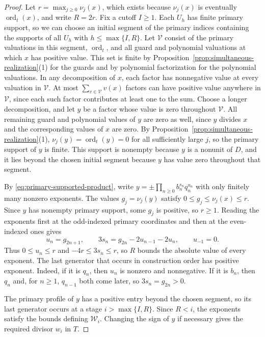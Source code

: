 \documentclass{article}
\DeclareMathOperator{\ord}{ord}
\theoremstyle{remark}
\begin{document}
\begin{proof}
    Let $r = \max_{j \ge 0} \nu_j(x)$, which exists because $\nu_j(x)$ is eventually $\ord_t(x)$, and write $R = 2r$.
    Fix a cutoff $I \ge 1$.
    Each $U_h$ has finite primary support, so we can choose an initial segment of the primary indices containing the supports of all $U_h$ with $h \le \max\{I, R\}$.
    Let $\mathcal{V}$ consist of the primary valuations in this segment, $\ord_t$, and all guard and polynomial valuations at which $x$ has positive value.
    This set is finite by Proposition~\ref{prop:simultaneous-realization}(1) for the guards and by polynomial factorization for the polynomial valuations.
    In any decomposition of $x$, each factor has nonnegative value at every valuation in $\mathcal{V}$.
    At most $\sum_{v \in \mathcal{V}} v(x)$ factors can have positive value anywhere in $\mathcal{V}$, since each such factor contributes at least one to the sum.
    Choose a longer decomposition, and let $y$ be a factor whose value is zero throughout $\mathcal{V}$.
    All remaining guard and polynomial values of $y$ are zero as well, since $y$ divides $x$ and the corresponding values of $x$ are zero.
    By Proposition~\ref{prop:simultaneous-realization}(1), $\nu_j(y) = \ord_t(y) = 0$ for all sufficiently large $j$, so the primary support of $y$ is finite.
    This support is nonempty because $y$ is a nonunit of $D$, and it lies beyond the chosen initial segment because $y$ has value zero throughout that segment.

    By \eqref{eq:primary-supported-product}, write $y = \pm \prod_{n \ge 0} b_n^{s_n} q_n^{u_n}$ with only finitely many nonzero exponents.
    The values $g_j = \nu_j(y)$ satisfy $0 \le g_j \le \nu_j(x) \le r$.
    Since $y$ has nonempty primary support, some $g_j$ is positive, so $r \ge 1$.
    Reading the exponents first at the odd-indexed primary coordinates and then at the even-indexed ones gives
    \[
        u_n = g_{2n + 1}, \qquad 3s_n = g_{2n} - 2u_{n - 1} - 2u_n,
        \qquad u_{-1} = 0.
    \]
    Thus $0 \le u_n \le r$ and $-4r \le 3s_n \le r$, so $R$ bounds the absolute value of every exponent.
    The last generator that occurs in construction order has positive exponent.
    Indeed, if it is $q_n$, then $u_n$ is nonzero and nonnegative.
    If it is $b_n$, then $q_n$ and, for $n \ge 1$, $q_{n - 1}$ both come later, so $3s_n = g_{2n} > 0$.

    The primary profile of $y$ has a positive entry beyond the chosen segment, so its last generator occurs at a stage $i > \max\{I, R\}$.
    Since $R < i$, the exponents satisfy the bounds defining $\mathcal{W}_i$.
    Changing the sign of $y$ if necessary gives the required divisor $w_i$ in $T$.
\end{proof}
\end{document}
